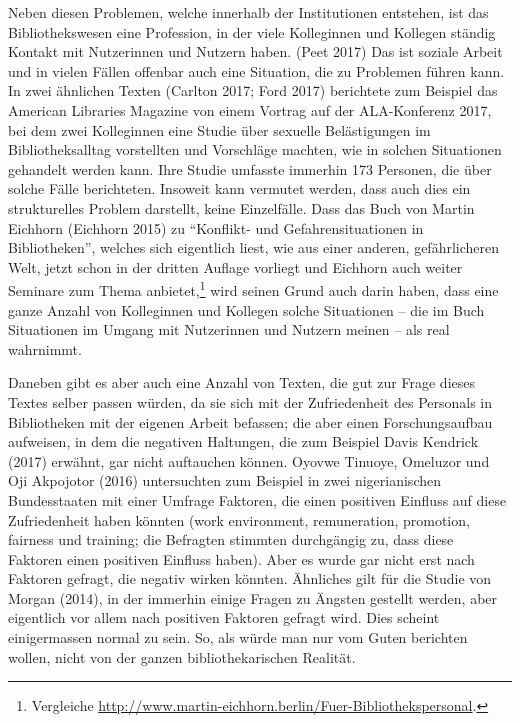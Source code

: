 \documentclass[a4paper,
fontsize=11pt,
oneside,
numbers=noperiodatend,
parskip=half-,
bibliography=totoc,
final
]{scrartcl}
\begin{document}
Neben diesen Problemen, welche innerhalb der Institutionen entstehen,
ist das Bibliothekswesen eine Profession, in der viele Kolleginnen und
Kollegen ständig Kontakt mit Nutzerinnen und Nutzern haben. (Peet 2017)
Das ist soziale Arbeit und in vielen Fällen offenbar auch eine
Situation, die zu Problemen führen kann. In zwei ähnlichen Texten
(Carlton 2017; Ford 2017) berichtete zum Beispiel das American Libraries
Magazine von einem Vortrag auf der ALA-Konferenz 2017, bei dem zwei
Kolleginnen eine Studie über sexuelle Belästigungen im Bibliotheksalltag
vorstellten und Vorschläge machten, wie in solchen Situationen gehandelt
werden kann. Ihre Studie umfasste immerhin 173 Personen, die über solche
Fälle berichteten. Insoweit kann vermutet werden, dass auch dies ein
strukturelles Problem darstellt, keine Einzelfälle. Dass das Buch von
Martin Eichhorn (Eichhorn 2015) zu \enquote{Konflikt- und
Gefahrensituationen in Bibliotheken}, welches sich eigentlich liest, wie
aus einer anderen, gefährlicheren Welt, jetzt schon in der dritten
Auflage vorliegt und Eichhorn auch weiter Seminare zum Thema
anbietet,\footnote{Vergleiche
  \url{http://www.martin-eichhorn.berlin/Fuer-Bibliothekspersonal}.}
wird seinen Grund auch darin haben, dass eine ganze Anzahl von
Kolleginnen und Kollegen solche Situationen -- die im Buch Situationen
im Umgang mit Nutzerinnen und Nutzern meinen -- als real wahrnimmt.

Daneben gibt es aber auch eine Anzahl von Texten, die gut zur Frage
dieses Textes selber passen würden, da sie sich mit der Zufriedenheit
des Personals in Bibliotheken mit der eigenen Arbeit befassen; die aber
einen Forschungsaufbau aufweisen, in dem die negativen Haltungen, die
zum Beispiel Davis Kendrick (2017) erwähnt, gar nicht auftauchen können.
Oyovwe Tinuoye, Omeluzor und Oji Akpojotor (2016) untersuchten zum
Beispiel in zwei nigerianischen Bundesstaaten mit einer Umfrage
Faktoren, die einen positiven Einfluss auf diese Zufriedenheit haben
könnten (work environment, remuneration, promotion, fairness und
training; die Befragten stimmten durchgängig zu, dass diese Faktoren
einen positiven Einfluss haben). Aber es wurde gar nicht erst nach
Faktoren gefragt, die negativ wirken könnten. Ähnliches gilt für die
Studie von Morgan (2014), in der immerhin einige Fragen zu Ängsten
gestellt werden, aber eigentlich vor allem nach positiven Faktoren
gefragt wird. Dies scheint einigermassen normal zu sein. So, als würde
man nur vom Guten berichten wollen, nicht von der ganzen
bibliothekarischen Realität.
\end{document}
